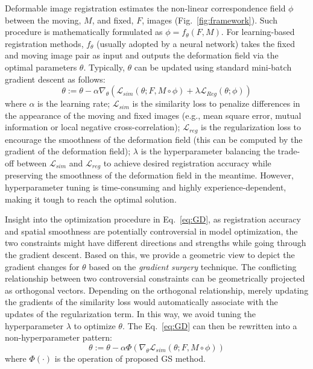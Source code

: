 \documentclass[runningheads]{llncs}
\begin{document}
Deformable image registration estimates the non-linear correspondence field $\phi$ between the moving, $M$, and fixed, $F$, images (Fig.~\ref{fig:framework}). Such procedure is mathematically formulated as $\phi = f_\theta(F, M)$. For learning-based registration methods, $f_\theta$ (usually adopted by a neural network) takes the fixed and moving image pair as input and outputs the deformation field via the optimal parameters $\theta$. Typically, $\theta$ can be updated using standard mini-batch gradient descent as follows:
\begin{equation}
    \label{eq:GD}
    \theta := \theta - \alpha \nabla_\theta \left(\mathcal{L}_{sim}(\theta; F, M \circ \phi) + \lambda \mathcal{L}_{Reg}(\theta; \phi) \right)
\end{equation}
where $\alpha$ is the learning rate; $\mathcal{L}_{sim}$ is the similarity loss to penalize differences in the appearance of the moving and fixed images (e.g., mean square error, mutual information or local negative cross-correlation); $\mathcal{L}_{reg}$ is the regularization loss to encourage the smoothness of the deformation field (this can be computed by the gradient of the deformation field); $\lambda$ is the hyperparameter balancing the trade-off between $\mathcal{L}_{sim}$ and $\mathcal{L}_{reg}$ to achieve desired registration accuracy while preserving the smoothness of the deformation field in the meantime. 
However, hyperparameter tuning is time-consuming and highly experience-dependent, making it tough to reach the optimal solution. 

Insight into the optimization procedure in Eq.~\ref{eq:GD}, as registration accuracy and spatial smoothness are potentially controversial in model optimization, the two constraints might have different directions and strengths while going through the gradient descent. 
Based on this, we provide a geometric view to depict the gradient changes for $\theta$ based on the \textit{gradient surgery} technique. The conflicting relationship between two controversial constraints can be geometrically projected as orthogonal vectors. Depending on the orthogonal relationship, merely updating the gradients of the similarity loss would automatically associate with the updates of the regularization term. In this way, we avoid tuning the hyperparameter $\lambda$ to optimize $\theta$.
The Eq.~\ref{eq:GD} can then be rewritten into a non-hyperparameter pattern:
\begin{equation}
    \theta := \theta - \alpha \Phi ( \nabla_\theta \mathcal{L}_{sim}(\theta; F, M \circ \phi) )
\end{equation}
where $\Phi(\cdot)$ is the operation of proposed GS method.
\end{document}
